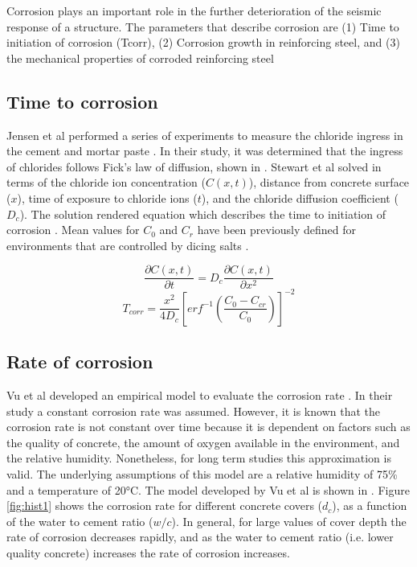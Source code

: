 Corrosion plays an important role in the further deterioration of the seismic response of a structure. The parameters that describe corrosion are (1) Time to initiation of corrosion (Tcorr), (2) Corrosion growth in reinforcing steel, and (3) the mechanical properties of corroded reinforcing steel

\subsection{Time to corrosion}

 Jensen et al performed a series of experiments to measure the chloride ingress in the cement and mortar paste  \cite{Jensen1999}. In their study, it was determined that the ingress of chlorides follows Fick's law of diffusion, shown in . Stewart et al solved   in terms of the chloride ion concentration ($C(x,t)$), distance from concrete surface ($x$), time of exposure to chloride ions ($t$), and the chloride diffusion coefficient ($D_c$). The solution rendered equation  which describes the time to initiation of corrosion    \cite{Stewart1998}\cite{Y.Liu1998a}\cite{Thoft-Christensen}. Mean values for $C_0$ and $C_r$ have been previously defined for environments that are controlled by dicing salts \cite{Ghosh2010}\cite{Weyers1994}\cite{Enright1998}.

\begin{equation}
	\frac{\partial C(x,t)}{\partial t} = D_c \frac{\partial C(x,t)}{\partial x^2}
	\label{eq:ficks_law}
\end{equation}
\newline
\begin{equation}
  T_{corr}=\frac{x^2}{4 D_c} \left[erf^{-1} \left(\frac{C_0-C_{cr}}{C_0} \right) \right]^{-2}
  \label{eq.three}
\end{equation} 

\subsection{Rate of corrosion}

Vu et al developed an empirical model to evaluate the corrosion rate \cite{Vu2000}\cite{Stewart1998}. In their study a constant corrosion rate was assumed. However, it is known that the corrosion rate is not constant over time because it is dependent on factors such as the quality of concrete, the amount of oxygen available in the environment, and the relative humidity.  Nonetheless, for long term studies this approximation is valid. The underlying assumptions of this model are a relative humidity of 75\% and a temperature of 20°C. The model developed by Vu et al is shown in . Figure \ref{fig:hist1} shows the corrosion rate for different concrete covers ($d_c$), as a function of the water to cement ratio ($w/c$). In general, for large values of cover depth the rate of corrosion decreases rapidly, and as the water to cement ratio (i.e. lower quality concrete) increases the rate of corrosion increases.

